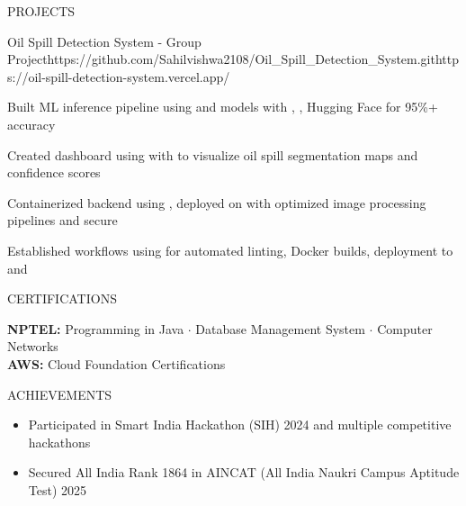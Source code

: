 \documentclass{resume}
\begin{document}
\begin{rSection}{PROJECTS}
\begin{rProject}{Oil Spill Detection System - Group Project}{https://github.com/Sahilvishwa2108/Oil_Spill_Detection_System.git}{https://oil-spill-detection-system.vercel.app/}
\item Built ML inference pipeline using  and  models with , , Hugging Face for 95\%+ accuracy
\item Created dashboard using  with  to visualize oil spill segmentation maps and confidence scores
\item Containerized backend using , deployed on  with optimized image processing pipelines and secure 
\item Established  workflows using  for automated linting, Docker builds, deployment to  and 
\end{rProject}

\end{rSection}

\begin{rSection}{CERTIFICATIONS}

\textbf{NPTEL:} Programming in Java $\cdot$ Database Management System $\cdot$ Computer Networks \\[1pt]
\textbf{AWS:} Cloud Foundation Certifications

\end{rSection}

\begin{rSection}{ACHIEVEMENTS}

\begin{itemize}[leftmargin=12pt, itemsep=0pt, label={\small$\bullet$}]
\item Participated in Smart India Hackathon (SIH) 2024 and multiple competitive hackathons
\item Secured All India Rank 1864 in AINCAT (All India Naukri Campus Aptitude Test) 2025
\end{itemize}

\end{rSection}
\end{document}
